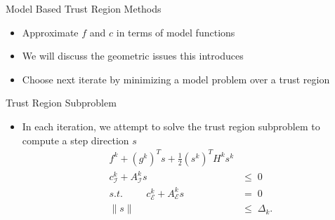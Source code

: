 \documentclass{beamer}
\begin{document}
\begin{frame}{Model Based Trust Region Methods}
    \begin{itemize}
        \setlength\itemsep{2em}
    	\item Approximate $f$ and $c$ in terms of model functions
	    \item We will discuss the geometric issues this introduces
	    \item Choose next iterate by minimizing a model problem over a trust region
	\end{itemize}
\end{frame}



\begin{frame}{Trust Region Subproblem}
    \begin{itemize}
        \item In each iteration, we attempt to solve the trust region subproblem to compute a step direction $s$
\begin{align*}f^k + (g^k)^Ts + \frac 1 2 (s^k)^T H^ks^k  &\\
     c_{{\mathcal{I}}}^k + A_{{\mathcal{I}}}^ks       &\le \; 0  \\
s.t. \hspace{1cm} c_{{\mathcal{E}}}^k + A_{{\mathcal{E}}}^ks           &=\; 0 \\
     \| s \|                      &\le \; \Delta_k.
\end{align*}
    \end{itemize}
\end{frame}





\end{document}
